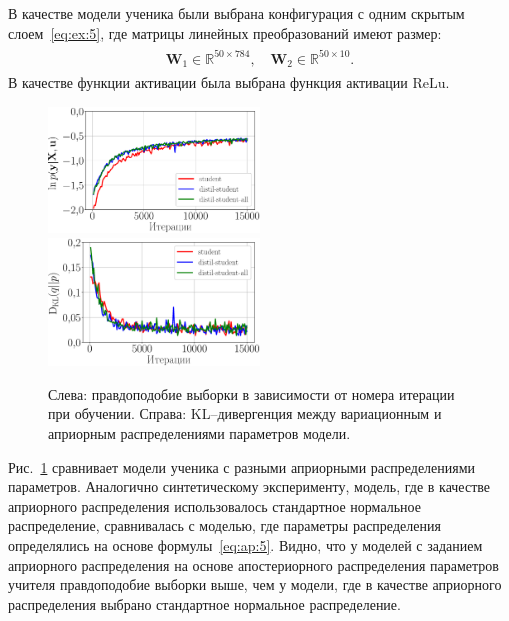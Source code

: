 \documentclass[12pt]{a&t}
\begin{document}
В качестве модели ученика были выбрана конфигурация с одним скрытым слоем~\eqref{eq:ex:5}, где матрицы линейных преобразований имеют размер:
\begin{gather}
\label{eq:ex:7}
\begin{aligned}
\mathbf{W}_{1} \in \mathbb{R}^{50 \times 784}, \quad \mathbf{W}_{2} \in \mathbb{R}^{50 \times 10}.
\end{aligned}
\end{gather}
В качестве функции активации была выбрана функция активации $\text{ReLu}$.

\begin{figure}[h!]
\includegraphics[width=0.5\textwidth]{fashionmnist_likelihood_2_layers.eps}
\includegraphics[width=0.5\textwidth]{fashionmnist_D_KL_2_layers.eps}
\caption{Слева: правдоподобие выборки в зависимости от номера итерации при обучении. Справа: KL--дивергенция между вариационным и априорным распределениями параметров модели.}
\label{exp:fig3}
\end{figure}

Рис.~\ref{exp:fig3} сравнивает модели ученика с разными априорными распределениями параметров.
Аналогично синтетическому эксперименту, модель, где в качестве априорного распределения использовалось стандартное нормальное распределение, сравнивалась с моделью, где параметры распределения определялись на основе формулы~\eqref{eq:ap:5}. Видно, что у моделей с заданием априорного распределения на основе апостериорного распределения параметров учителя правдоподобие выборки выше, чем у модели, где в качестве априорного распределения выбрано стандартное нормальное распределение.
\end{document}
